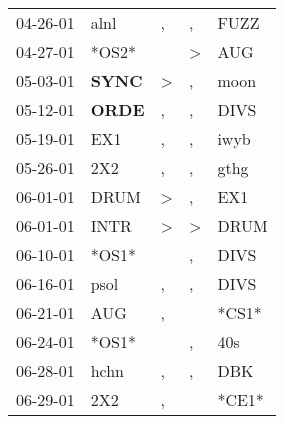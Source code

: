 \begin{supertabular}{p{0.07\textwidth}p{0.06\textwidth}p{0.02\textwidth}p{0.02\textwidth}p{0.06\textwidth}}
          04-26-01\textsuperscript{} &           alnl\textsuperscript{} &                , &                , &           FUZZ\textsuperscript{} \\
          04-27-01\textsuperscript{} &                            *OS2* &                  &     \textgreater &            AUG\textsuperscript{} \\
          05-03-01\textsuperscript{} &  \textbf{SYNC\textsuperscript{}} &     \textgreater &                , &           moon\textsuperscript{} \\
          05-12-01\textsuperscript{} &  \textbf{ORDE\textsuperscript{}} &                , &                , &           DIVS\textsuperscript{} \\
          05-19-01\textsuperscript{} &            EX1\textsuperscript{} &                , &                , &           iwyb\textsuperscript{} \\
          05-26-01\textsuperscript{} &            2X2\textsuperscript{} &                , &                , &           gthg\textsuperscript{} \\
          06-01-01\textsuperscript{} &           DRUM\textsuperscript{} &     \textgreater &                , &            EX1\textsuperscript{} \\
          06-01-01\textsuperscript{} &           INTR\textsuperscript{} &     \textgreater &     \textgreater &           DRUM\textsuperscript{} \\
          06-10-01\textsuperscript{} &                            *OS1* &                  &                , &           DIVS\textsuperscript{} \\
          06-16-01\textsuperscript{} &           psol\textsuperscript{} &                , &                , &           DIVS\textsuperscript{} \\
          06-21-01\textsuperscript{} &            AUG\textsuperscript{} &                , &                  &                            *CS1* \\
          06-24-01\textsuperscript{} &                            *OS1* &                  &                , &            40s\textsuperscript{} \\
          06-28-01\textsuperscript{} &           hchn\textsuperscript{} &                , &                , &            DBK\textsuperscript{} \\
          06-29-01\textsuperscript{} &            2X2\textsuperscript{} &                , &                  &                            *CE1* \\

\end{supertabular}
